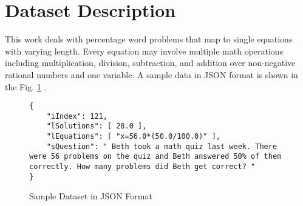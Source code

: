 \documentclass[document.tex]{subfiles}
\begin{document}

\section{Dataset Description}
This work deals with percentage word problems that map to single equations with varying length. Every equation may involve multiple math operations including multiplication, division, subtraction, and addition over non-negative rational numbers and one variable. A sample data in JSON format is shown in the Fig. \ref{fig:data} .
\begin{figure}[H]
	\begin{center}
		\begin{lstlisting}
{
	"iIndex": 121,
	"lSolutions": [ 28.0 ],
	"lEquations": [ "x=56.0*(50.0/100.0)" ],
	"sQuestion": " Beth took a math quiz last week. There were 56 problems on the quiz and Beth answered 50% of them correctly. How many problems did Beth get correct? "
}
		\end{lstlisting}
	\end{center}
	\caption{Sample Dataset in JSON Format}
	\label{fig:data}
\end{figure}
\end{document}
